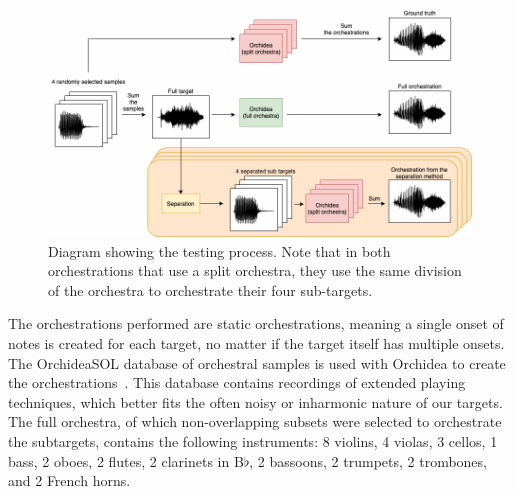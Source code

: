 \documentclass{article}
\begin{document}
		\begin{figure}[t]
			\centering
				\includegraphics[width=\textwidth]{figures/evaluation_diagram.png}
				\caption{Diagram showing the testing process. Note that in both orchestrations that use a split orchestra, they use the same division of the orchestra to orchestrate their four sub-targets.}\label{fig:eval_diagram}
		\end{figure}
		
		The orchestrations performed are static orchestrations, meaning a single onset of notes is created for each target, no matter if the target itself has multiple onsets. The OrchideaSOL database of orchestral samples is used with Orchidea to create the orchestrations~\cite{Cella2020c}. This database contains recordings of extended playing techniques, which better fits the often noisy or inharmonic nature of our targets. The full orchestra, of which non-overlapping subsets were selected to orchestrate the subtargets, contains the following instruments: 8 violins, 4 violas, 3 cellos, 1 bass, 2 oboes, 2 flutes, 2 clarinets in B$\flat$, 2 bassoons, 2 trumpets, 2 trombones, and 2 French horns.
		
\end{document}
